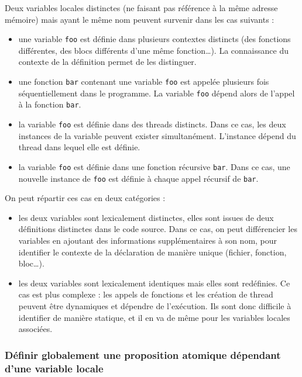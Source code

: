 Deux variables locales distinctes (ne faisant pas référence à la même
adresse mémoire) mais ayant le même nom peuvent survenir dans les cas
suivants :

\begin{itemize}
\item
  une variable \texttt{foo} est définie dans plusieurs contextes
  distincts (des fonctions différentes, des blocs différents d'une même
  fonction\ldots{}). La connaissance du contexte de la définition permet
  de les distinguer.
\item
  une fonction \texttt{bar} contenant une variable \texttt{foo}
  est appelée plusieurs fois séquentiellement dans le programme. La
  variable \texttt{foo} dépend alors de l'appel à la fonction
  \texttt{bar}.
\item
  la variable \texttt{foo} est définie dans des threads distincts.
  Dans ce cas, les deux instances de la variable peuvent exister
  simultanément. L'instance dépend du thread dans lequel elle est
  définie.
\item
  la variable \texttt{foo} est définie dans une fonction récursive
  \texttt{bar}. Dans ce cas, une nouvelle instance de \texttt{foo}
  est définie à chaque appel récursif de \texttt{bar}.
\end{itemize}

On peut répartir ces cas en deux catégories :

\begin{itemize}
\item
  les deux variables sont lexicalement distinctes, elles sont issues de
  deux définitions distinctes dans le code source. Dans ce cas, on peut
  différencier les variables en ajoutant des informations
  supplémentaires à son nom, pour identifier le contexte de la
  déclaration de manière unique (fichier, fonction, bloc\ldots{}).
\item
  les deux variables sont lexicalement identiques mais elles sont
  redéfinies. Ce cas est plus complexe : les appels de fonctions et les
  création de thread peuvent être dynamiques et dépendre de l'exécution.
  Ils sont donc difficile à identifier de manière statique, et il en va
  de même pour les variables locales associées.
\end{itemize}

\subsubsection{Définir globalement une proposition atomique dépendant
d'une variable locale}

